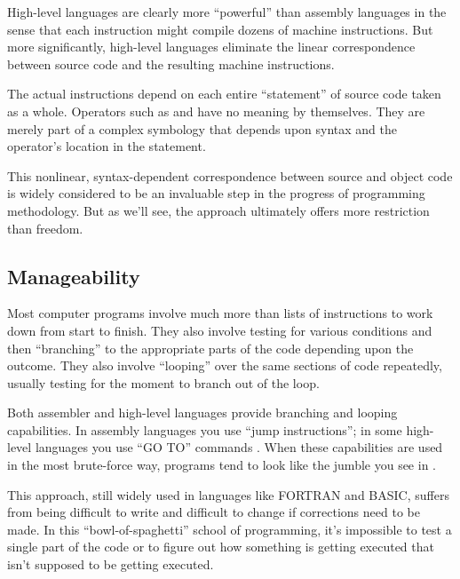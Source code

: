 High-level languages are clearly more ``powerful'' than
assembly languages
in the sense that each instruction might compile dozens of machine
instructions. But more significantly, high-level languages eliminate
the linear correspondence between source code and the resulting
machine instructions.

The actual instructions depend on each entire ``statement'' of
source code taken as a whole. Operators such as
\forth{+} and \forth{=} have no meaning
by themselves. They are merely part of a complex symbology that depends
upon syntax and the operator's location in the statement.

This nonlinear, syntax-dependent correspondence between source and
object code is widely considered to be an invaluable step in the
progress of programming methodology. But as we'll see, the approach
ultimately offers more restriction than freedom.


\subsection{Manageability}
Most computer programs involve much more than lists of instructions
to work down from start to finish. They also involve testing for various
conditions and then ``branching'' to the appropriate parts of the
code depending upon the outcome. They also involve ``looping''
over the same sections of code repeatedly, usually testing for the
moment to branch out of the loop.

Both assembler and high-level languages
provide branching and looping
capabilities. In assembly languages
you use ``jump instructions'';
in some high-level languages
you use ``GO TO'' commands
.
When these capabilities are used in the most brute-force way, programs
tend to look like the jumble you see in .


This approach, still widely used in languages like
FORTRAN and BASIC,
suffers from being difficult to write and difficult
to change if corrections need to be made. In this ``bowl-of-spaghetti''
school of programming, it's impossible to test a single part of the
code or to figure out how something is getting executed that isn't
supposed to be getting executed.

